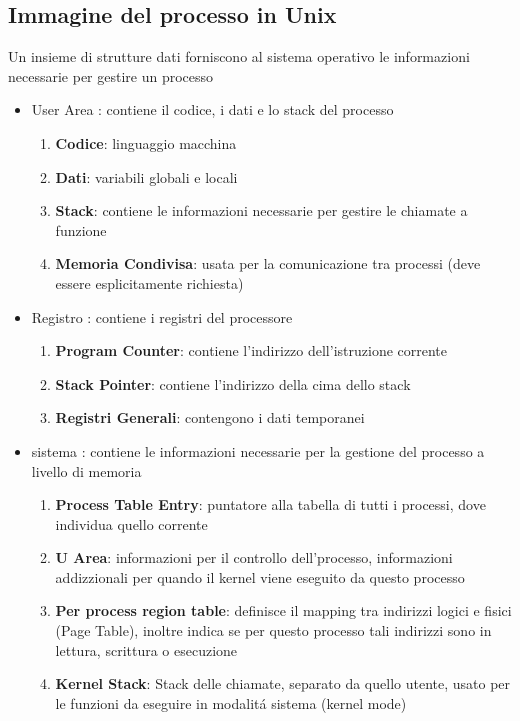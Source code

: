 \documentclass[11pt]{article}
\begin{document}
\subsection{Immagine del processo in Unix}
Un insieme di strutture dati forniscono al sistema operativo le informazioni necessarie per gestire un processo
\begin{itemize}
    \item User Area : contiene il codice, i dati e lo stack del processo
    \begin{enumerate}
        \item \textbf{Codice}: linguaggio macchina
        \item \textbf{Dati}: variabili globali e locali
        \item \textbf{Stack}: contiene le informazioni necessarie per gestire le chiamate a funzione
        \item \textbf{Memoria Condivisa}: usata per la comunicazione tra processi (deve essere esplicitamente richiesta)
    \end{enumerate}
    \item Registro : contiene i registri del processore
    \begin{enumerate}
        \item \textbf{Program Counter}: contiene l'indirizzo dell'istruzione corrente
        \item \textbf{Stack Pointer}: contiene l'indirizzo della cima dello stack
        \item \textbf{Registri Generali}: contengono i dati temporanei
    \end{enumerate}
    \item sistema : contiene le informazioni necessarie per la gestione del processo a livello di memoria
    \begin{enumerate}
        \item \textbf{Process Table Entry}: puntatore alla tabella di tutti i processi, dove individua quello corrente
        \item \textbf{U Area}: informazioni per il controllo dell'processo, informazioni addizzionali per quando il kernel viene eseguito da questo processo
        \item \textbf{Per process region table}: definisce il mapping tra indirizzi logici e fisici (Page Table), inoltre indica se per questo processo tali indirizzi sono in lettura, scrittura o esecuzione
        \item \textbf{Kernel Stack}: Stack delle chiamate, separato da quello utente, usato per le funzioni da eseguire in modalitá sistema (kernel mode)
    \end{enumerate}
\end{itemize}
\end{document}
